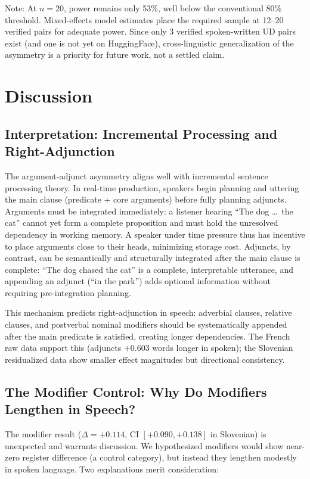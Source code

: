 \documentclass[11pt,letterpaper]{article}
\begin{document}
Note: At $n=20$, power remains only 53\%, well below the conventional 80\% threshold. Mixed-effects model estimates place the required sample at 12--20 verified pairs for adequate power. Since only 3 verified spoken-written UD pairs exist (and one is not yet on HuggingFace), cross-linguistic generalization of the asymmetry is a priority for future work, not a settled claim.

\section{Discussion}

\subsection{Interpretation: Incremental Processing and Right-Adjunction}

The argument-adjunct asymmetry aligns well with incremental sentence processing theory. In real-time production, speakers begin planning and uttering the main clause (predicate + core arguments) before fully planning adjuncts. Arguments must be integrated immediately: a listener hearing ``The dog \ldots\ the cat'' cannot yet form a complete proposition and must hold the unresolved dependency in working memory. A speaker under time pressure thus has incentive to place arguments close to their heads, minimizing storage cost. Adjuncts, by contrast, can be semantically and structurally integrated after the main clause is complete: ``The dog chased the cat'' is a complete, interpretable utterance, and appending an adjunct (``in the park'') adds optional information without requiring pre-integration planning.

This mechanism predicts right-adjunction in speech: adverbial clauses, relative clauses, and postverbal nominal modifiers should be systematically appended after the main predicate is satisfied, creating longer dependencies. The French raw data support this (adjuncts $+0.603$ words longer in spoken); the Slovenian residualized data show smaller effect magnitudes but directional consistency.

\subsection{The Modifier Control: Why Do Modifiers Lengthen in Speech?}

The modifier result ($\Delta = +0.114$, CI $[+0.090, +0.138]$ in Slovenian) is unexpected and warrants discussion. We hypothesized modifiers would show near-zero register difference (a control category), but instead they lengthen modestly in spoken language. Two explanations merit consideration:
\end{document}
